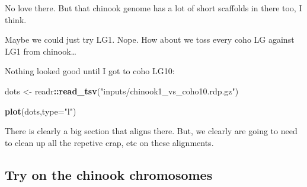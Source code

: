 \documentclass[]{krantz}
\makeatletter
\newenvironment{Shaded}{\begin{snugshade}}{\end{snugshade}}
\newcommand{\BuiltInTok}[1]{#1}
\newcommand{\CommentTok}[1]{\textcolor[rgb]{0.37,0.37,0.37}{\textit{#1}}}
\newcommand{\DataTypeTok}[1]{\textcolor[rgb]{0.27,0.27,0.27}{#1}}
\newcommand{\ExtensionTok}[1]{#1}
\newcommand{\FunctionTok}[1]{\textcolor[rgb]{0,0,0}{#1}}
\newcommand{\KeywordTok}[1]{\textcolor[rgb]{0.27,0.27,0.27}{\textbf{#1}}}
\newcommand{\NormalTok}[1]{#1}
\newcommand{\OperatorTok}[1]{\textcolor[rgb]{0.43,0.43,0.43}{\textbf{#1}}}
\newcommand{\StringTok}[1]{\textcolor[rgb]{0.5,0.5,0.5}{#1}}
\newcommand{\VariableTok}[1]{\textcolor[rgb]{0,0,0}{#1}}
\newenvironment{kframe}{%
\medskip{}
\setlength{\fboxsep}{.8em}
 \def\at@end@of@kframe{}%
 \ifinner\ifhmode%
  \def\at@end@of@kframe{\end{minipage}}%
  \begin{minipage}{\columnwidth}%
 \fi\fi%
 \def\FrameCommand##1{\hskip\@totalleftmargin \hskip-\fboxsep
 \colorbox{shadecolor}{##1}\hskip-\fboxsep
     \hskip-\linewidth \hskip-\@totalleftmargin \hskip\columnwidth}%
 \MakeFramed {\advance\hsize-\width
   \@totalleftmargin\z@ \linewidth\hsize
   \@setminipage}}%
 {\par\unskip\endMakeFramed%
 \at@end@of@kframe}
\renewenvironment{Shaded}{\begin{kframe}}{\end{kframe}}
\makeatother
\begin{document}
No love there. But that chinook genome has a lot of short scaffolds in there too, I think.

Maybe we could just try LG1. Nope. How about we toss every coho LG against LG1 from chinook\ldots{}

\begin{Shaded}
\end{Shaded}

Nothing looked good until I got to coho LG10:

\begin{Shaded}
\begin{Highlighting}[]
\NormalTok{dots <-}\StringTok{ }\NormalTok{readr}\OperatorTok{::}\KeywordTok{read_tsv}\NormalTok{(}\StringTok{"inputs/chinook1_vs_coho10.rdp.gz"}\NormalTok{)}

\KeywordTok{plot}\NormalTok{(dots,}\DataTypeTok{type=}\StringTok{"l"}\NormalTok{)}
\end{Highlighting}
\end{Shaded}

There is clearly a big section that aligns there. But, we clearly are going to need to
clean up all the repetive crap, etc on these alignments.

\hypertarget{try-on-the-chinook-chromosomes}{%
\subsection{Try on the chinook chromosomes}\label{try-on-the-chinook-chromosomes}}
\end{document}

